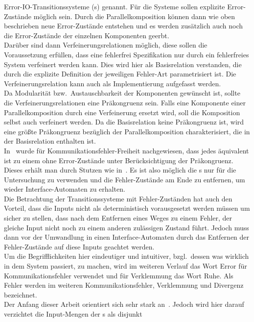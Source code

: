 Error-IO-Transitionssysteme (\EIO{}s) genannt. Für die Systeme sollen explizite
Error-Zustände möglich sein. Durch die Parallelkomposition können dann wie oben
beschrieben neue Error-Zustände entstehen und es werden zusätzlich auch noch die
Error-Zustände der einzelnen Komponenten geerbt.\\
Darüber sind dann Verfeinerungsrelationen möglich, diese sollen die
Voraussetzung erfüllen, dass eine fehlerfrei Spezifikation nur durch ein
fehlerfreies System verfeinert werden kann. Dies wird hier als Basisrelation
verstanden, die durch die explizite Definition der jeweiligen Fehler-Art parametrisiert
ist. Die Verfeinerungsrelation kann auch als Implementierung aufgefasst
werden.\\
Da Modularität bzw.\ Austauschbarkeit der Komponenten gewünscht ist, sollte die
Verfeinerungsrelationen eine Präkongruenz sein. Falls eine Komponente einer
Parallelkomposition durch eine Verfeinerung ersetzt wird, soll die Komposition
selbst auch verfeinert werden. Da die Basisrelation keine Präkongruenz ist,
wird eine größte Präkongruenz bezüglich der Parallelkomposition
charakterisiert, die in der Basisrelation enthalten ist.\\
In~\cite{Vogler2014EIO} wurde für Kommunikationsfehler-Freiheit nachgewiesen, dass jedes \EIO{}
äquivalent ist zu einem ohne Error-Zustände unter Berücksichtigung der
Präkongruenz. Dieses erhält man durch Stutzen wie in~\cite{Alfaro2004}. Es ist
also möglich die \EIO{}s nur für die Untersuchung zu verwenden und die
Fehler-Zustände am Ende zu entfernen, um wieder Interface-Automaten zu
erhalten.\\
Die Betrachtung der Transitionssysteme mit Fehler-Zuständen hat auch den
Vorteil, dass die Inputs nicht als deterministisch vorausgesetzt werden müssen
um sicher zu stellen, dass nach dem Entfernen eines Weges zu einem Fehler, der
gleiche Input nicht noch zu einem anderen zulässigen Zustand führt. Jedoch muss
dann vor der Umwandlung in einen Interface-Automaten durch das Entfernen der
Fehler-Zustände auf diese Inputs geachtet werden.\\
Um die Begrifflichkeiten hier eindeutiger und intuitiver, bzgl.\ dessen was
wirklich in dem System passiert, zu machen, wird im weiteren Verlauf
das Wort Error für Kommunikationsfehler verwendet und für Verklemmung das Wort
Ruhe. Als Fehler werden im weiteren Kommunikationsfehler, Verklemmung und
Divergenz bezeichnet.\\
Der Anfang dieser Arbeit orientiert sich sehr stark an~\cite{Vogler2014EIO}.
Jedoch wird hier darauf verzichtet die Input-Mengen der \EIO{}s als disjunkt
